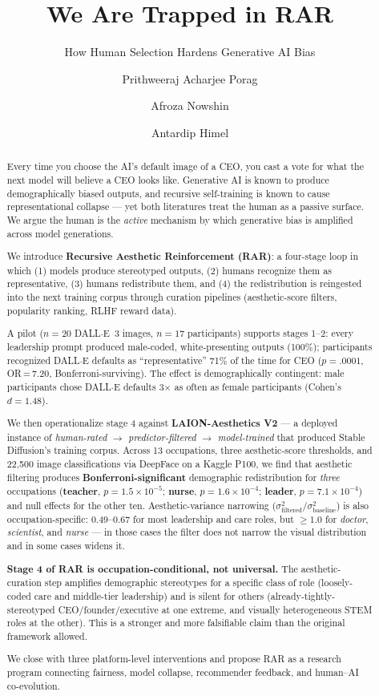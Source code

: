 \documentclass[sigconf,nonacm]{acmart}
\title{We Are Trapped in RAR}
\subtitle{How Human Selection Hardens Generative AI Bias}
\author{Prithweeraj Acharjee Porag}
\affiliation{%
  \institution{University of Toledo}
  \city{Toledo}\state{OH}\country{USA}
}
\author{Afroza Nowshin}
\affiliation{%
  \institution{University of Toledo}
  \city{Toledo}\state{OH}\country{USA}
}
\author{Antardip Himel}
\affiliation{%
  \institution{University of Toledo}
  \city{Toledo}\state{OH}\country{USA}
}
\begin{document}
\begin{abstract}
Every time you choose the AI's default image of a CEO, you cast a vote for what the next model will believe a CEO looks like. Generative AI is known to produce demographically biased outputs, and recursive self-training is known to cause representational collapse --- yet both literatures treat the human as a passive surface. We argue the human is the \emph{active} mechanism by which generative bias is amplified across model generations.

We introduce \textbf{Recursive Aesthetic Reinforcement (RAR)}: a four-stage loop in which (1) models produce stereotyped outputs, (2) humans recognize them as representative, (3) humans redistribute them, and (4) the redistribution is reingested into the next training corpus through curation pipelines (aesthetic-score filters, popularity ranking, RLHF reward data).

A pilot (\(n=20\) DALL$\cdot$E~3 images, \(n=17\) participants) supports stages 1--2: every leadership prompt produced male-coded, white-presenting outputs (100\%); participants recognized DALL$\cdot$E defaults as ``representative'' 71\% of the time for CEO (\(p=.0001\), OR\,=\,7.20, Bonferroni-surviving). The effect is demographically contingent: male participants chose DALL$\cdot$E defaults 3$\times$ as often as female participants (Cohen's \(d=1.48\)).

We then operationalize stage 4 against \textbf{LAION-Aesthetics V2} --- a deployed instance of \emph{human-rated $\to$ predictor-filtered $\to$ model-trained} that produced Stable Diffusion's training corpus. Across 13 occupations, three aesthetic-score thresholds, and 22{,}500 image classifications via DeepFace on a Kaggle P100, we find that aesthetic filtering produces \textbf{Bonferroni-significant} demographic redistribution for \emph{three} occupations (\textbf{teacher}, \(p=1.5\!\times\!10^{-5}\); \textbf{nurse}, \(p=1.6\!\times\!10^{-4}\); \textbf{leader}, \(p=7.1\!\times\!10^{-4}\)) and null effects for the other ten. Aesthetic-variance narrowing (\(\sigma^2_{\text{filtered}}/\sigma^2_{\text{baseline}}\)) is also occupation-specific: 0.49--0.67 for most leadership and care roles, but \(\geq 1.0\) for \emph{doctor}, \emph{scientist}, and \emph{nurse} --- in those cases the filter does not narrow the visual distribution and in some cases widens it.

\textbf{Stage 4 of RAR is occupation-conditional, not universal.} The aesthetic-curation step amplifies demographic stereotypes for a specific class of role (loosely-coded care and middle-tier leadership) and is silent for others (already-tightly-stereotyped CEO/founder/executive at one extreme, and visually heterogeneous STEM roles at the other). This is a stronger and more falsifiable claim than the original framework allowed.

We close with three platform-level interventions and propose RAR as a research program connecting fairness, model collapse, recommender feedback, and human--AI co-evolution.
\end{abstract}
\end{document}

